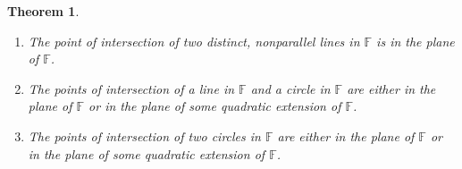 \documentclass[11pt]{article}
\newtheorem{theorem}{Theorem}[section]
\theoremstyle{definition}
\begin{document}
\begin{theorem}
  \begin{enumerate}
    \item The point of intersection of two distinct, nonparallel lines in $\mathbb{F}$ is in the plane of $\mathbb{F}$.
    \item The points of intersection of a line in $\mathbb{F}$ and a circle in $\mathbb{F}$ are either in the plane of $\mathbb{F}$
      or in the plane of some quadratic extension of $\mathbb{F}$.
    \item The points of intersection of two circles in $\mathbb{F}$ are either in the plane of $\mathbb{F}$
      or in the plane of some quadratic extension of $\mathbb{F}$.
  \end{enumerate}
  \label{theorem: intersections}
\end{theorem}
\end{document}

